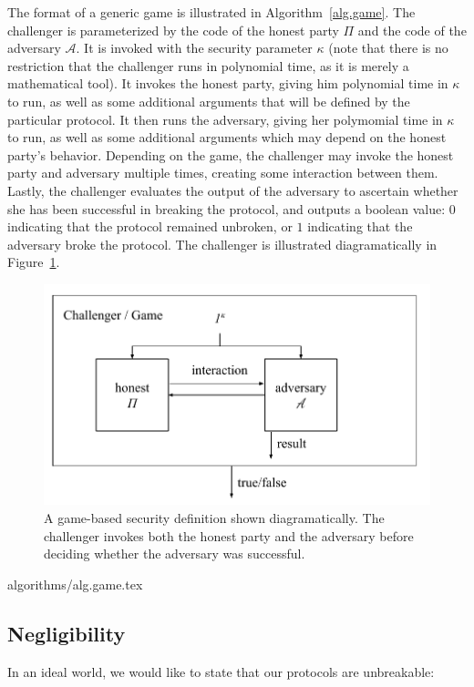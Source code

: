 The format of a generic game is illustrated in Algorithm~\ref{alg.game}. The challenger
is parameterized by the code of the honest party $\Pi$ and the code of the adversary $\mathcal{A}$.
It is invoked with the security parameter $\kappa$ (note that there is no restriction that the challenger
runs in polynomial time, as it is merely a mathematical tool).
It invokes the honest party, giving him polynomial time in $\kappa$ to run, as well as some
additional arguments that will be defined by the particular protocol. It then runs the adversary,
giving
her
polymomial time in $\kappa$ to run, as well as some additional arguments which may
depend on the honest party's behavior. Depending on the game, the challenger may invoke the honest party
and adversary multiple times, creating some interaction between them. Lastly, the challenger evaluates the output of the
adversary to ascertain whether she has been successful in breaking the protocol, and outputs a boolean value:
$0$ indicating that the protocol remained unbroken, or $1$ indicating that the adversary broke the protocol.
The challenger
is illustrated diagramatically in Figure~\ref{fig.game}.

\begin{figure}[h]
    \centering
    \includegraphics[width=0.7 \columnwidth,keepaspectratio]{figures/game-based-security.pdf}
    \caption{A game-based security definition shown diagramatically. The challenger invokes both
    the honest party and the adversary before deciding whether the adversary was successful.}
    \label{fig.game}
\end{figure}

{algorithms/alg.game.tex}

\subsection*{Negligibility}

In an ideal world, we would like to state that our protocols are unbreakable:

